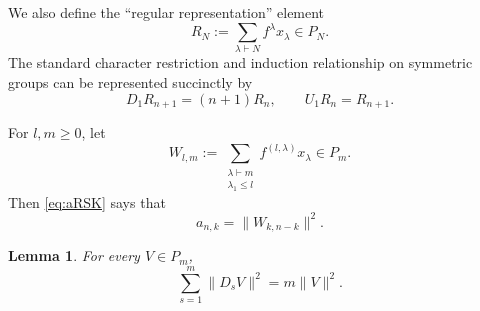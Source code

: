 \documentclass[a4paper,draft]{amsart}
\newtheorem{lemma}{Lemma}
\begin{document}

We also define the ``regular representation'' element
\[
R_N:=\sum_{\lambda\vdash N}f^\lambda x_\lambda\in P_N.
\]
The standard character restriction and induction relationship on symmetric groups can be represented succinctly by
\[
D_1R_{n+1}=(n+1)R_n,\qquad U_1R_n=R_{n+1}.
\]

For $l,m\geq0$, let
\[
W_{l,m}:=
\sum_{\substack{\lambda\vdash m\\\lambda_1\leq l}} f^{(l,\lambda)}x_\lambda\in P_m.
\]
Then \eqref{eq:aRSK} says that
\begin{equation}\label{eq:aW}
   a_{n,k}=\|W_{k,n-k}\|^2.
\end{equation}


\begin{lemma}\label{lem:parseval}
For every $V\in P_m$,
\begin{equation}\label{eq:parseval}
    \sum_{s=1}^m\|D_sV\|^2=m\|V\|^2.
\end{equation}
\end{lemma}
\end{document}
